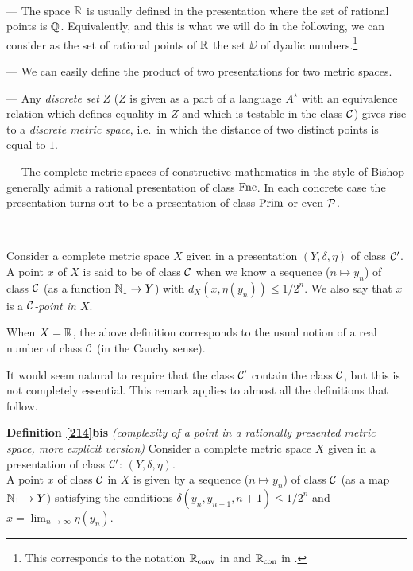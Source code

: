 \begin{examples}\label{213}~

\noindent 
--- The space $\mathbb {R}$ is usually defined in the presentation where the set of rational points is $\mathbb {Q}$. Equivalently, and this is what we will do in the following, we can consider as the set of rational points of $\mathbb {R}$ the set $\DD$ of dyadic numbers.\footnote{This corresponds to the notation $\mathbb {R}_{\rm conv}$ in \cite{LL} and $\mathbb {R}_{\rm con}$ in \cite{Ko83}.}

\noindent 
--- We can easily define the product of two presentations for two metric spaces.

\noindent 
--- Any {\em discrete set} $Z$ ($Z$ is given as a part of a language $A^{\star}$ with an equivalence relation which defines equality in $Z$ and which is testable in the class ${{\cal C}}$) gives rise to a {\em discrete metric space}, i.e.\ in which the distance of two distinct points is equal to $1$. 

\noindent 
--- The complete metric spaces of constructive mathematics in the style of Bishop \cite{BB} generally admit a rational presentation of class ${\rm Fnc}$. 
In each concrete case the presentation turns out to be a presentation of class ${\rm Prim}$ or even ${\cal P}$. 
\end{examples}

\begin{definition} \label{214} ~

\noindent 
Consider a complete metric space $X$ given in a presentation $(Y,\delta,\eta)$ of class ${{\cal C}}'$. A point $x$ of $X$ is said to be of class ${{\cal C}}$ when we know a sequence ($n \mapsto y_n$) of class ${{\cal C}}$ (as a function $\mathbb {N}_1 \to Y$) with $d_X(x,\eta(y_n)) \leq 1/2^n$.
We also say that $x$ is a \emph{${{\cal C}}$-point in $X$}.
\end{definition}

\begin{example} \label{215}
When $X = \mathbb {R}$, the above definition corresponds to the usual notion of a real number of class ${{\cal C}}$ (in the Cauchy sense).
\end{example}

\begin{remark} \label{216}
It would seem natural to require that the class ${{\cal C}}'$ contain the class ${{\cal C}}$, but this is not completely essential. This remark applies to almost all the definitions that follow.
\end{remark}


\mni
{\bf Definition \ref{214}bis}
{\em (complexity of a point in a rationally presented metric space, more explicit version)} 
 Consider a complete metric space $X$ given in a presentation of class ${{\cal C}}'$: $(Y, \delta,\eta)$. 
\\ 
A point $x$ of class ${{\cal C}}$ in $X$ is given by a sequence ($n \mapsto y_n$) of class ${{\cal C}}$ (as a map $\mathbb {N}_1 \to Y$) satisfying the  conditions
$
\delta(y_n,y_{n+1},n+1) \leq 1/2^n
$ 
and $x=\lim_{n\to \infty}\eta(y_n)$.


